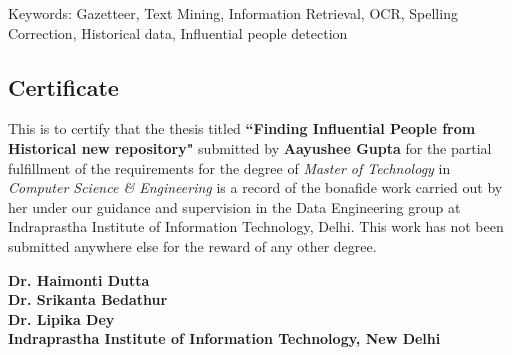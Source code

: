 \documentclass[letterpaper,11pt]{report}
\begin{document}


\newpage

\pagestyle{empty}
\vspace*{7.1in} 
Keywords: Gazetteer, Text Mining, Information Retrieval, OCR, Spelling Correction, Historical data, Influential people detection

\newpage

\begin{center}
\section*{Certificate}\label{section:certificate}
\end{center}
This is to certify that the thesis titled \textbf{``Finding Influential People from Historical new repository"} submitted by \textbf{Aayushee Gupta} for the partial fulfillment of the requirements for the degree of \emph{Master of Technology} in \emph{Computer Science \& Engineering} is a record of the bonafide work carried out by her under our guidance and supervision in the Data Engineering group at Indraprastha Institute of Information Technology, Delhi. This work has not been submitted anywhere else for the reward of any other degree. \\ \vspace{0.5in}

\textbf{Dr. Haimonti Dutta}\\
\textbf{Dr. Srikanta Bedathur}\\
\textbf{Dr. Lipika Dey}\\
\textbf{Indraprastha Institute of Information Technology, New Delhi}
\end{document}
